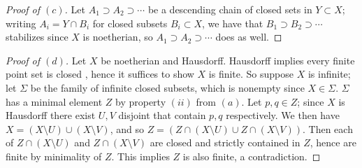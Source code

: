 \documentclass[12pt,letterpaper]{article}
\theoremstyle{definition}
\theoremstyle{remark}
\numberwithin{equation}{section}
\numberwithin{figure}{problem}
\begin{document}
\begin{proof}[Proof of $(c)$]
  Let $A_1 \supset A_2 \supset \cdots$ be a descending chain of closed sets
  in $Y \subset X$; writing $A_i = Y \cap B_i$ for closed subsets
  $B_i \subset X$, we have that $B_1 \supset B_2 \supset \cdots$ stabilizes
  since $X$ is noetherian, so $A_1 \supset A_2 \supset \cdots$ does as well.
\end{proof}
\begin{proof}[Proof of $(d)$]
  Let $X$ be noetherian and Hausdorff.
  Hausdorff implies every finite point set is closed \cite[Thm.~17.8]{Mun00},
  hence it suffices to show $X$ is finite.
  So suppose $X$ is infinite; let $\Sigma$ be the family of infinite closed
  subsets, which is nonempty since $X \in \Sigma$.
  $\Sigma$ has a minimal element $Z$ by property $(ii)$ from $(a)$.
  Let $p,q \in Z$; since $X$ is Hausdorff there exist $U,V$ disjoint that
  contain $p,q$ respectively.
  We then have $X = (X \setminus U) \cup (X \setminus V)$, and so
  $Z = (Z \cap (X \setminus U) \cup Z\cap(X \setminus V))$.
  Then each of $Z \cap (X \setminus U)$ and $Z \cap (X \setminus V)$ are
  closed and strictly contained in $Z$, hence are finite by minimality of $Z$.
  This implies $Z$ is also finite, a contradiction.
\end{proof}
\end{document}
